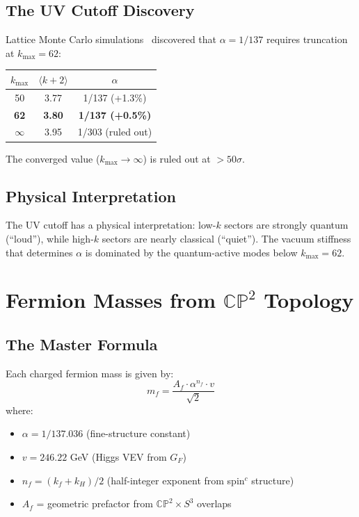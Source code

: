 \documentclass[11pt,a4paper]{article}
\newcommand{\CP}{\mathbb{CP}}
\begin{document}
\subsection{The UV Cutoff Discovery}

Lattice Monte Carlo simulations~\cite{DFD_Alpha} discovered that $\alpha = 1/137$ requires truncation at $k_{\max} = 62$:

\begin{center}
\begin{tabular}{ccc}
$k_{\max}$ & $\langle k + 2 \rangle$ & $\alpha$ \\
\hline
50 & 3.77 & 1/137 (+1.3\%) \\
\textbf{62} & \textbf{3.80} & \textbf{1/137 (+0.5\%)} \\
$\infty$ & 3.95 & 1/303 (ruled out)
\end{tabular}
\end{center}

The converged value ($k_{\max} \to \infty$) is ruled out at $>50\sigma$.

\subsection{Physical Interpretation}

The UV cutoff has a physical interpretation: low-$k$ sectors are strongly quantum (``loud''), while high-$k$ sectors are nearly classical (``quiet''). The vacuum stiffness that determines $\alpha$ is dominated by the quantum-active modes below $k_{\max} = 62$.

\section{Fermion Masses from $\CP^2$ Topology}

\subsection{The Master Formula}

Each charged fermion mass is given by:
\begin{equation}
m_f = \frac{A_f \cdot \alpha^{n_f} \cdot v}{\sqrt{2}}
\end{equation}
where:
\begin{itemize}
\item $\alpha = 1/137.036$ (fine-structure constant)
\item $v = 246.22$ GeV (Higgs VEV from $G_F$)
\item $n_f = (k_f + k_H)/2$ (half-integer exponent from spin$^c$ structure)
\item $A_f$ = geometric prefactor from $\CP^2 \times S^3$ overlaps
\end{itemize}
\end{document}
